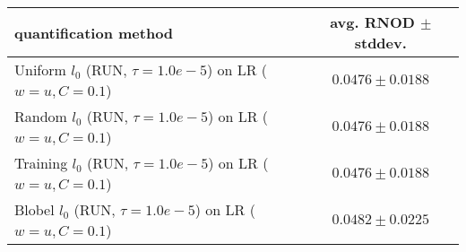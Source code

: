 \begin{tabular}{lc}
  \toprule
  quantification method & avg. RNOD $\pm$ stddev. \\
  \midrule
  Uniform $l_0$ (RUN, $\tau=1.0e-5$) on LR ($w=u, C=0.1$) & $\mathbf{0.0476 \pm 0.0188}$ \\
  Random $l_0$ (RUN, $\tau=1.0e-5$) on LR ($w=u, C=0.1$) & $\mathbf{0.0476 \pm 0.0188}$ \\
  Training $l_0$ (RUN, $\tau=1.0e-5$) on LR ($w=u, C=0.1$) & $\mathbf{0.0476 \pm 0.0188}$ \\
  Blobel $l_0$ (RUN, $\tau=1.0e-5$) on LR ($w=u, C=0.1$) & $\mathbf{0.0482 \pm 0.0225}$ \\
  \bottomrule
\end{tabular}
